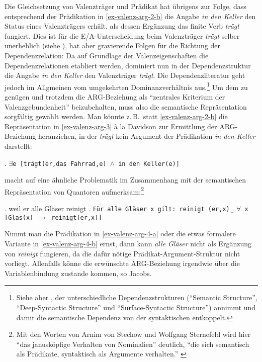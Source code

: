 Die Gleichsetzung von Valenzträger und Prädikat hat übrigens zur Folge, dass entsprechend der Prädikation in \ref{ex-valenz-arg-2-b} die Angabe {\it in den Keller} den Status eines Valenzträgers erhält, als dessen Ergänzung das finite Verb {\it trägt} fungiert. Dies ist für die E/A-Unterscheidung beim Valenzträger {\it trägt} selber unerheblich (siehe \citealt[59]{Jacobs:94}), hat aber gravierende Folgen für die Richtung der Dependenzrelation: Da auf Grundlage der Valenzeigenschaften die Dependenzrelationen etabliert werden, dominiert nun in der Dependenzstruktur die Angabe {\it in den Keller} den Valenzträger {\it trägt}. Die  Dependenzliteratur geht jedoch im Allgmeinen vom umgekehrten Dominanzverhältnis aus.\footnote{Siehe aber \citet[5--7]{Melcuk:09}, der unterschiedliche Dependenzstrukturen ("`Semantic Structure"', "`Deep-Syntactic Structure"' und "`Surface-Syntactic Structure"') annimmt und damit die semantische Dependenz von der syntaktischen entkoppelt.} Um dem zu genügen und trotzdem die ARG-Beziehung als "`zentrales Kriterium der Valenzgebundenheit"' \citep[768]{Storrer:03} beizubehalten, muss also die semantische Repräsentation sorgfältig gewählt werden. Man könnte z.\,B.\ statt \ref{ex-valenz-arg-2-b} die Repräsentation in \ref{ex-valenz-arg-3} \`a la Davidson zur Ermittlung der ARG-Beziehung heranziehen, in der {\it trägt} kein Argument der Prädikation {\it in den Keller} darstellt:  

\ex. \label{ex-valenz-arg-3} {\tt $\exists$e [trägt(er,das Fahrrad,e) $\wedge$ in den Keller(e)]}

\citet[19f]{Jacobs:94} macht auf eine ähnliche Problematik im Zusammenhang mit der semantischen Repräsentation von Quantoren aufmerksam:\footnote{Mit den Worten von Arnim von Stechow und Wolfgang Sternefeld wird hier "`das janusköpfige Verhalten von Nominalien"' deutlich, "`die sich semantisch als Prädikate, syntaktisch als Argumente verhalten."' \citep[71]{Stechow:Sternefeld:88}}    

\ex. \label{ex-valenz-arg-4} weil er alle Gläser reinigt \hfill \citep[(12)]{Jacobs:94}
\a. \label{ex-valenz-arg-4-a} {\tt Für alle Gläser x gilt: reinigt (er,x)}     \hfill \citep[(12a)]{Jacobs:94}
\b. \label{ex-valenz-arg-4-b} {\tt $\forall$ x [Glas(x) $\to$ reinigt(er,x)]}

Nimmt man die Prädikation in \ref{ex-valenz-arg-4-a} oder die etwas formalere Variante in \ref{ex-valenz-arg-4-b} ernst, dann kann {\it alle Gläser} nicht als Ergänzung von {\it reinigt} fungieren, da die dafür nötige Prädikat-Argument-Struktur nicht vorliegt. Allenfalls könne die erwünschte ARG-Beziehung irgendwie über die Variablenbindung zustande kommen, so Jacobs. 

